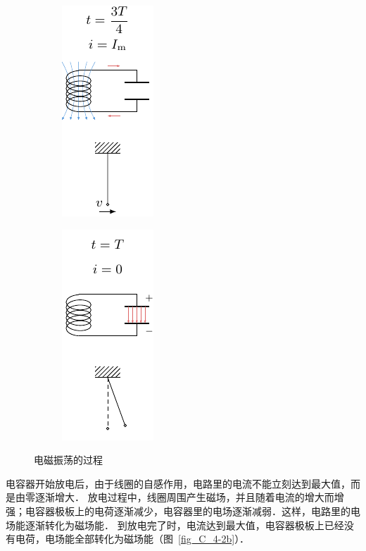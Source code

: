 \begin{figure}[htbp]
\begin{subfigure}{0.19\linewidth}
        \caption{}\label{fig_C_4-2c}
    \end{subfigure}
    \hfil
    \begin{subfigure}{0.19\linewidth}
        \centering
        \includegraphics{fig/C/4-2d.pdf}
        \caption{}\label{fig_C_4-2d}
    \end{subfigure}
    \hfil
    \begin{subfigure}{0.19\linewidth}
        \centering
        \includegraphics{fig/C/4-2e.pdf}
        \caption{}\label{fig_C_4-2e}
    \end{subfigure}
    \caption{电磁振荡的过程}\label{fig_C_4-2}
\end{figure}

电容器开始放电后，由于线圈的自感作用，电路里的电流不能立刻达到最大值，而是由零逐渐增大．
放电过程中，线圈周围产生磁场，并且随着电流的增大而增强；电容器极板上的电荷逐渐减少，电容器里的电场逐渐减弱．这样，电路里的电场能逐渐转化为磁场能．
到放电完了时，电流达到最大值，电容器极板上已经没有电荷，电场能全部转化为磁场能（图~\ref{fig_C_4-2b}）．


